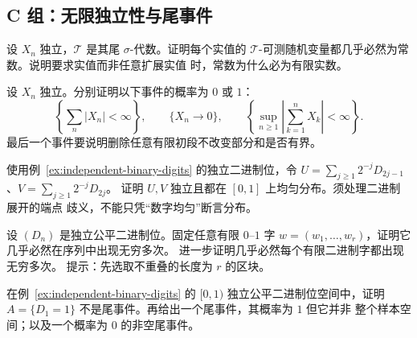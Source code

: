 \subsection*{C 组：无限独立性与尾事件}
\begin{enumerate}[label=\textbf{\thechapter.\arabic*.},resume]
设 $X_n$ 独立，$\mathcal T$ 是其尾 $\sigma$-代数。证明每个实值的
$\mathcal T$-可测随机变量都几乎必然为常数。说明要求实值而非任意扩展实值
时，常数为什么必为有限实数。

设 $X_n$ 独立。分别证明以下事件的概率为 $0$ 或 $1$：
\[
 \left\{\sum_n|X_n|<\infty\right\},\qquad
 \{X_n\to0\},\qquad
 \left\{\sup_{n\ge1}\left|\sum_{k=1}^nX_k\right|<\infty\right\}.
\]
最后一个事件要说明删除任意有限初段不改变部分和是否有界。

使用例~\ref{ex:independent-binary-digits} 的独立二进制位，令
$U=\sum_{j\ge1}2^{-j}D_{2j-1}$、$V=\sum_{j\ge1}2^{-j}D_{2j}$。
证明 $U,V$ 独立且都在 $[0,1]$ 上均匀分布。须处理二进制展开的端点
歧义，不能只凭“数字均匀”断言分布。

设 $(D_n)$ 是独立公平二进制位。固定任意有限 $0$--$1$ 字
$w=(w_1,\ldots,w_r)$，证明它几乎必然在序列中出现无穷多次。
进一步证明几乎必然每个有限二进制字都出现无穷多次。
提示：先选取不重叠的长度为 $r$ 的区块。

在例~\ref{ex:independent-binary-digits} 的 $[0,1)$ 独立公平二进制位空间中，证明
$A=\{D_1=1\}$ 不是尾事件。再给出一个尾事件，其概率为 $1$ 但它并非
整个样本空间；以及一个概率为 $0$ 的非空尾事件。
\end{enumerate}
